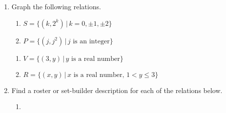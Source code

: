\documentclass{ximera}
\begin{document}
\begin{example}  \label{relationgraphingexample}   $~$

\begin{enumerate} 

\item Graph the following relations. 

\begin{multicols}{2}
\begin{enumerate}

\item  $S = \{ \left(k, 2^{k} \right) \, | \, k = 0, \pm 1, \pm 2 \}$

\item  $P = \{ \left(j, j^2\right) \, | \, \text{$j$ is an integer} \}$

\setcounter{HW}{\value{enumii}}
\end{enumerate}
\end{multicols}

\begin{multicols}{2}
\begin{enumerate}
\setcounter{enumii}{\value{HW}}

\item  $V = \{ (3,y) \, | \, \mbox{$y$ is a real number} \}$

\item  $R = \{ (x,y) \, | \, \text{$x$ is a real number, $1 < y \leq 3$} \}$

\setcounter{HW}{\value{enumii}}
\end{enumerate}
\end{multicols}

\item  Find a roster or set-builder description for each of the relations below.

\begin{multicols}{2}
\begin{enumerate}

\item $~$

% 
 


\end{enumerate}
\end{multicols}
\end{enumerate}
\end{example}
\end{document}
